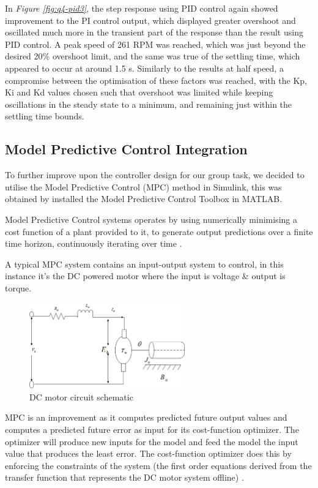 \documentclass[11pt, onecolumn]{article}
\begin{document}
\par In \textit{Figure \ref{fig:q4-pid3}}, the step response using PID control again showed improvement to the PI control output, which displayed greater overshoot and oscillated much more in the transient part of the response than the result using PID control. A peak speed of 261 RPM was reached, which was just beyond the desired 20\% overshoot limit, and the same was true of the settling time, which appeared to occur at around 1.5 s. Similarly to the results at half speed, a compromise between the optimisation of these factors was reached, with the Kp, Ki and Kd values chosen such that overshoot was limited while keeping oscillations in the steady state to a minimum, and remaining just within the settling time bounds.
\subsection*{Model Predictive Control Integration}
\par To further improve upon the controller design for our group task, we decided to utilise the Model Predictive Control (MPC) method in Simulink, this was obtained by installed the Model Predictive Control Toolbox in MATLAB.
\par Model Predictive Control systems operates by using numerically minimising a cost function of a plant provided to it, to generate output predictions over a finite time horizon, continuously iterating over time \cite{Nikolaou2001}.
\par A typical MPC system contains an input-output system to control, in this instance it’s the DC powered motor where the input is voltage \& output is torque.
\begin{figure}[h!]
    \centering
    \includegraphics[width=0.6\textwidth]{q4-schematic.png}
    \caption{DC motor circuit schematic \cite{article}}
    \label{fig:q4-schematic}
\end{figure}
\par MPC is an improvement as it computes predicted future output values and computes a predicted future error as input for its cost-function optimizer. The optimizer will produce new inputs for the model and feed the model the input value that produces the least error. The cost-function optimizer does this by enforcing the constraints of the system (the first order equations derived from the transfer function that represents the DC motor system offline) \cite{libretexts123MIMO}.
\end{document}
